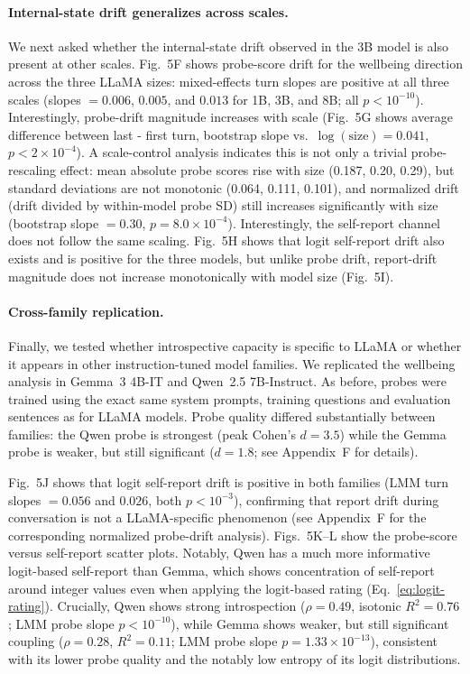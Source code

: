 \documentclass[10pt]{article}
\begin{document}
\paragraph{Internal-state drift generalizes across scales.}
We next asked whether the internal-state drift observed in the 3B model is also present at other scales.
Fig.~5F shows probe-score drift for the wellbeing direction across the three LLaMA sizes: mixed-effects turn slopes are positive at all three scales (slopes $= 0.006$, $0.005$, and $0.013$ for 1B, 3B, and 8B; all $p < 10^{-10}$). Interestingly, probe-drift magnitude increases with scale (Fig.~5G shows average difference between last - first turn, bootstrap slope vs.\ $\log(\text{size}) = 0.041$, $p < 2 \times 10^{-4}$). A scale-control analysis indicates this is not only a trivial probe-rescaling effect: mean absolute probe scores rise with size (0.187, 0.20, 0.29), but standard deviations are not monotonic (0.064, 0.111, 0.101), and normalized drift (drift divided by within-model probe SD) still increases significantly with size (bootstrap slope $= 0.30$, $p = 8.0 \times 10^{-4}$).
Interestingly, the self-report channel does not follow the same scaling.
Fig.~5H shows that logit self-report drift also exists and is positive for the three models, but unlike probe drift, report-drift magnitude does not increase monotonically with model size (Fig.~5I).

\paragraph{Cross-family replication.}
Finally, we tested whether introspective capacity is specific to LLaMA or whether it appears in other instruction-tuned model families.
We replicated the wellbeing analysis in Gemma~3 4B-IT and Qwen~2.5 7B-Instruct. As before, probes were trained using the exact same system prompts, training questions and evaluation sentences as for LLaMA models.
Probe quality differed substantially between families: the Qwen probe is strongest (peak Cohen's $d = 3.5$) while the Gemma probe is weaker, but still significant ($d = 1.8$; see Appendix~F for details).

Fig.~5J shows that logit self-report drift is positive in both families (LMM turn slopes $= 0.056$ and $0.026$, both $p < 10^{-3}$), confirming that report drift during conversation is not a LLaMA-specific phenomenon (see Appendix~F for the corresponding normalized probe-drift analysis).
Figs.~5K--L show the probe-score versus self-report scatter plots. Notably, Qwen has a much more informative logit-based self-report than Gemma, which shows concentration of self-report around integer values even when applying the logit-based rating (Eq.~\ref{eq:logit-rating}).
Crucially, Qwen shows strong introspection ($\rho = 0.49$, isotonic $R^2 = 0.76$; LMM probe slope $p < 10^{-10}$), while Gemma shows weaker, but still significant coupling ($\rho = 0.28$, $R^2 = 0.11$; LMM probe slope $p = 1.33 \times 10^{-13}$), consistent with its lower probe quality and the notably low entropy of its logit distributions.
\end{document}
